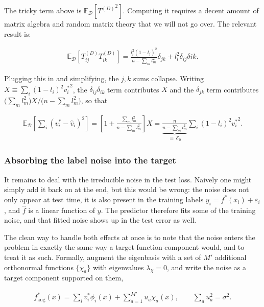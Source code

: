 The tricky term above is $\mathbb{E}_{\mathcal{D}}\left[{T^{(D)}}^2\right]$. Computing it requires a decent amount of matrix algebra and random matrix theory that we will not go over. The relevant result is:

\begin{align}
    \mathbb{E}_{\mathcal{D}}\left[T^{(D)}_{ij}T^{(D)}_{ik} \right]=\frac{l^2_i(1-l_j)^2}{n-\sum_m l^2_m}\delta_{jk}+l^2_i \delta_{ij}\delta{ik}.
\end{align}

Plugging this in and simplifying, the $j,k$ sums collapse. Writing
$X \equiv \sum_i (1-l_i)^2 {v^*_i}^2$, the $\delta_{ij}\delta_{ik}$ term contributes
$X$ and the $\delta_{jk}$ term contributes $\big(\sum_m l_m^2\big)X/\big(n-\sum_m l_m^2\big)$,
so that

\begin{align}
    \mathbb{E}_{\mathcal{D}}\left[\sum_i (v^*_i-\hat{v}_i)^2\right]
    = \left[1+\frac{\sum_m l^2_m}{n-\sum_m l^2_m}\right] X
    = \underbrace{\frac{n}{n-\sum_m l^2_m}}_{\textstyle \equiv\, \mathcal{E}_0} \sum_i (1-l_i)^2 {v^*_i}^2 .
\end{align}

\subsubsection{Absorbing the label noise into the target}

It remains to deal with the irreducible noise in the test loss. Naively one might simply
add it back on at the end, but this would be wrong: the noise does not only
appear at test time, it is also present in the training labels
$y_i = f^*(x_i)+\varepsilon_i$, and $\hat f$ is a linear function of $y$. The predictor
therefore fits some of the training noise, and that fitted noise shows up in
the test error as well.

The clean way to handle both effects at once is to note that the noise enters
the problem in exactly the same way a target function component would, and to
treat it as such. Formally, augment the eigenbasis with a set of $M'$ additional
orthonormal functions $\{\chi_a\}$ with eigenvalues $\lambda_{\chi}=0$, and write
the noise as a target component supported on them,

\begin{align}
    f^*_{\text{aug}}(x) = \sum_i v^*_i \phi_i(x) + \sum_{a=1}^{M'} u_a \chi_a(x),
    \qquad \sum_{a} u_a^2 = \sigma^2 .
\end{align}

